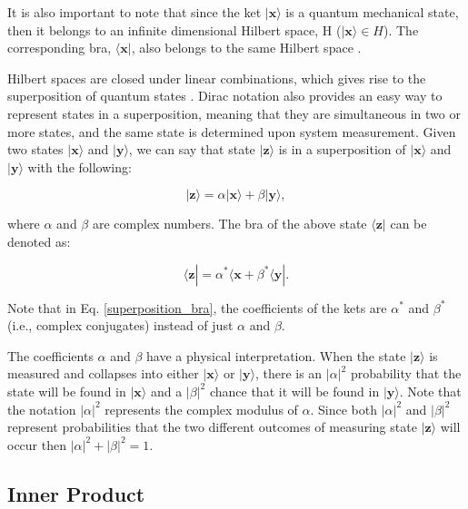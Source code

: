 It is also important to note that since the ket $|\textbf{x} \rangle$ is a quantum mechanical state, then it belongs to an infinite dimensional Hilbert space, H ($| \textbf{x} \rangle \in H$). The corresponding bra, $\langle \textbf{x} |$, also belongs to the same Hilbert space \cite{Ref5}.


Hilbert spaces are closed under linear combinations, which gives rise to the superposition of quantum states \cite{Ref5}. Dirac notation also provides an easy way to represent states in a superposition, meaning that they are simultaneous in two or more states, and the same state is determined upon system measurement. Given two states $| \textbf{x} \rangle$ and $| \textbf{y} \rangle$, we can say that state $| \textbf{z} \rangle$ is in a superposition of $| \textbf{x} \rangle$ and $| \textbf{y} \rangle$ with the following:

\begin{equation}
    | \textbf{z} \rangle = \alpha| \textbf{x} \rangle + \beta | \textbf{y} \rangle,
\end{equation}

where $\alpha$ and $\beta$ are complex numbers.  The bra of the above state $\langle \textbf{z} |$ can be denoted as: 

\begin{equation}\label{superposition_bra}
    \langle \textbf{z} | = \alpha^* \langle \textbf{x} + \beta^* \langle \textbf{y} |.
\end{equation}

Note that in Eq. \ref{superposition_bra}, the coefficients of the kets are $\alpha^*$ and $\beta^*$ (i.e., complex conjugates) instead of just $\alpha$ and $\beta$.

The coefficients $\alpha$ and $\beta$ have a physical interpretation. When the state $| \textbf{z} \rangle$ is measured and collapses into either $| \textbf{x} \rangle$ or $| \textbf{y} \rangle$, there is an $|\alpha|^2$ probability that the state will be found in $| \textbf{x} \rangle$ and a $|\beta|^2$ chance that it will be found in $| \textbf{y} \rangle$.  Note that the notation $|\alpha|^2$ represents the complex modulus of $\alpha$. Since both $|\alpha|^2$ and $|\beta|^2$ represent probabilities that the two different outcomes of measuring state $| \textbf{z} \rangle$ will occur then $|\alpha|^2 + |\beta|^2 = 1$.


\subsection*{Inner Product}

